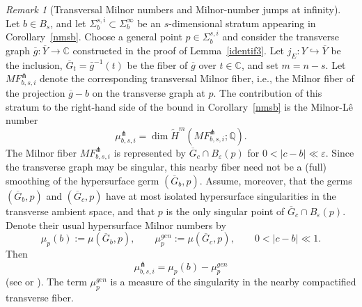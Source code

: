 \documentclass[12pt,leqno,twoside]{amsart}
\theoremstyle{remark}
\newtheorem{remark}[theorem]{\sc Remark}
\theoremstyle{remark}
\theoremstyle{definition}
\theoremstyle{remark}
\theoremstyle{remark}
\theoremstyle{remark}
\numberwithin{equation}{section}  %
\newcommand{\C}{\mathbb{C}}
\begin{document}
\begin{remark}[Transversal Milnor numbers and Milnor-number jumps at infinity]\label{calcmu}
Let $b\in B_s$, and let $\Sigma_b^{s,i}\subset\Sigma_b^\infty$ be an $s$-dimensional stratum appearing in Corollary~\ref{nmsb}. Choose a general point $p\in\Sigma_b^{s,i}$ and consider the transverse graph $\overline{g}:\overline{Y}\to\mathbb C$ constructed in the proof of Lemma~\ref{identif3}. Let $j_E:Y\hookrightarrow\overline{Y}$ be the inclusion, $\overline{G}_t=\bar g^{-1}(t)$ be the fiber of $\overline g$ over $t \in \C$, and set $m=n-s$. Let $MF_{b,s,i}^{\pitchfork}$ denote the corresponding transversal Milnor fiber, i.e., the Milnor fiber of the projection $\overline{g}-b$ on the transverse graph at $p$. The contribution of this stratum to the right-hand side of the bound in Corollary~\ref{nmsb} is the Milnor-L\^e number 
\[
 \mu_{b,s,i}^{\pitchfork}
 =\dim\widetilde H^{m}(MF_{b,s,i}^{\pitchfork};\mathbb Q).
\]
The Milnor fiber $MF_{b,s,i}^{\pitchfork}$ is represented by $\overline{G}_c\cap B_\varepsilon(p)$ for $0<|c-b|\ll\varepsilon$.
Since the transverse graph may be singular, this nearby fiber need
not be a (full) smoothing of the hypersurface germ $(\overline{G}_b,p)$.
Assume, moreover, that the germs $(\overline{G}_b,p)$ and $(\overline{G}_c,p)$ have at most isolated hypersurface singularities in the transverse ambient space, and that $p$ is the
only singular point of $\overline{G}_c\cap B_\varepsilon(p)$. Denote their usual hypersurface Milnor numbers by
\[
 \mu_p(b):=\mu(\overline{G}_b,p),\qquad
 \mu_p^{gen}:=\mu(\overline{G}_c,p),\qquad 0<|c-b|\ll1.
\]
Then
\begin{equation}\label{MilLe}
\mu_{b,s,i}^{\pitchfork}
       =\mu_p(b)-\mu_p^{gen}
\end{equation}
(see \cite[Example~6.2.20]{Di} or \cite[formula (2.2)]{ST0}). The term
$\mu_p^{gen}$ is a measure of the singularity in the nearby compactified transverse fiber.


\end{remark}
\end{document}
